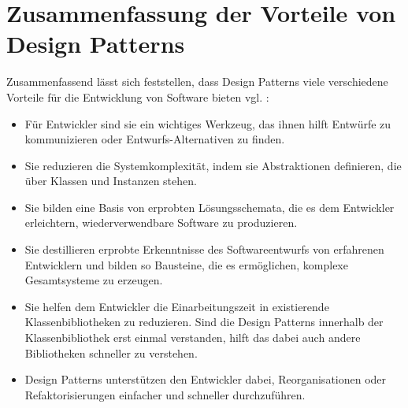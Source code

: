 \documentclass[fontsize=11pt,a4paper,final]{scrreprt}[2003/01/01]
\begin{document}
\section{Zusammenfassung der Vorteile von Design Patterns}
Zusammenfassend lässt sich feststellen, dass Design Patterns viele verschiedene Vorteile für die Entwicklung von Software bieten vgl. \cite{Gamma1993}:
\begin{itemize}
	\item Für Entwickler sind sie ein wichtiges Werkzeug, das ihnen hilft Entwürfe zu kommunizieren oder Entwurfs-Alternativen zu finden.
	\item Sie reduzieren die Systemkomplexität, indem sie Abstraktionen definieren, die über Klassen und Instanzen stehen.
	\item Sie bilden eine Basis von erprobten Lösungsschemata, die es dem Entwickler erleichtern, wiederverwendbare Software zu produzieren.
	\item Sie destillieren erprobte Erkenntnisse des Softwareentwurfs von erfahrenen Entwicklern und bilden so Bausteine, die es ermöglichen, komplexe Gesamtsysteme zu erzeugen.
	\item Sie helfen dem Entwickler die Einarbeitungszeit in existierende Klassenbibliotheken zu reduzieren. Sind die Design Patterns innerhalb der Klassenbibliothek erst einmal verstanden, hilft das dabei auch andere Bibliotheken schneller zu verstehen.
	\item Design Patterns unterstützen den Entwickler dabei, Reorganisationen oder Refaktorisierungen einfacher und schneller durchzuführen.
\end{itemize}
\end{document}

